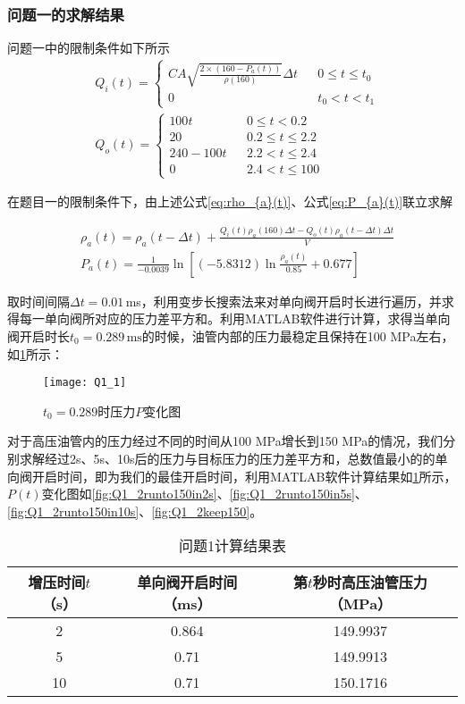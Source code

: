 \documentclass[withoutpreface,bwprint]{cumcmthesis} %
\begin{document}
\subsubsection{问题一的求解结果}
问题一中的限制条件如下所示
\begin{align}
&Q_i(t)=\left\{
\begin{array}{lcr}
CA\sqrt{\frac{2\times(160-P_a(t))}{\rho(160)}}\Delta t & & { 0\le t\le t_0}\\
0 & & {t_0<t<t_1}
\end{array} \right.\\
&Q_o(t)=\left\{
\begin{array}{lcr}
100t & & { 0\le t<0.2}\\
20 & & {0.2\le t\le 2.2}\\
240-100t & & {2.2<t\le 2.4}\\
0 & & {2.4<t\le 100}
\end{array} \right.
\end{align}

在题目一的限制条件下，由上述公式\cref{eq:rho_{a}(t)}、公式\cref{eq:P_{a}(t)}联立求解

\begin{align}
&\rho_a(t)=\rho_a(t-\Delta t)+\frac{Q_i(t) \rho_a(160) \Delta t-Q_o(t)\rho_a(t-\Delta t)\Delta t}{V}\\
&P_a(t)=\frac{1}{-0.0039}\ln{\left[(-5.8312)\ln\frac{\rho_a(t)}{0.85}+0.677\right]}	
\end{align}

取时间间隔$\Delta t=0.01\,$ms，利用变步长搜索法来对单向阀开启时长进行遍历，并求得每一单向阀所对应的压力差平方和。利用MATLAB软件进行计算，求得当单向阀开启时长$t_0=0.289\,\text{ms}$的时候，油管内部的压力最稳定且保持在100 MPa左右，如\cref{fig:Q1_1}所示：

\begin{figure}[!h]
	\centering
	\texttt{[image: Q1\_1]}
	\caption{$t_{0}=0.289$时压力$P$变化图}
	\label{fig:Q1_1}
\end{figure}
	
	
	
对于高压油管内的压力经过不同的时间从100 MPa增长到150 MPa的情况，我们分别求解经过2s、5s、10s后的压力与目标压力的压力差平方和，总数值最小的的单向阀开启时间，即为我们的最佳开启时间，利用MATLAB软件计算结果如\cref{tab:wt1}所示，$P(t)$变化图如\cref{fig:Q1_2runto150in2s}、\cref{fig:Q1_2runto150in5s}、\cref{fig:Q1_2runto150in10s}、\cref{fig:Q1_2keep150}。

\begin{table}[htbp]
	\centering
	\caption{问题1计算结果表}
	\begin{tabular}{ccc}
		\hline
		\hline
		增压时间$t$（s） & 单向阀开启时间（ms） & 第$t$秒时高压油管压力（MPa） \\
		\hline
		\hline
		2     & 0.864 & 149.9937 \\
		5     & 0.71  & 149.9913 \\
		10    & 0.71  & 150.1716 \\
		\hline
		\hline
	\end{tabular}%
	\label{tab:wt1}%
\end{table}%
\end{document}
